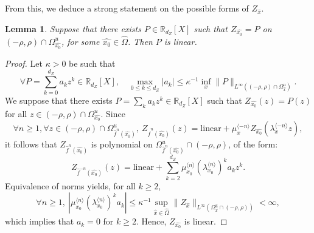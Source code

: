 \documentclass[a4paper]{article}
\newtheorem{lemma}[theorem]{Lemma}
\theoremstyle{definition}
\begin{document}
From this, we deduce a strong statement on the possible forms of $Z_{\widehat{x}}$.

\begin{lemma}\label{lem:polytolin}
Suppose that there exists $P \in \mathbb{R}_{d_Z}[X]$ such that $Z_{{\widehat{x_0}}} = P$ on $(-\rho,\rho) \cap \Omega_{{\widehat{x_0}}}^u$, for some ${\widehat{x_0}} \in \widehat{\Omega}$. Then $P$ is linear. 
\end{lemma}

\begin{proof}
Let $\kappa>0$ be such that $$ \forall P = \sum_{k=0}^{d_Z} a_k z^k \in \mathbb{R}_{d_Z}[X], \quad \max_{0 \leq k \leq d_Z} |a_k| \leq \kappa^{-1} \inf_x \|P\|_{L^\infty( (-\rho,\rho) \cap \Omega_{\widehat{x}}^u )}.$$
We suppose that there exists $P = \sum_k a_k z^k \in \mathbb{R}_{d_Z}[X]$ such that $Z_{{\widehat{x_0}}}(z) = P(z)$ for all $z \in (-\rho,\rho) \cap \Omega_{{\widehat{x_0}}}^u$. Since
$$ \forall n \geq 1, \forall z \in (-\rho,\rho) \cap \Omega_{\widehat{f}^{n}({\widehat{x_0}})}^u , \ Z_{\widehat{f}^n({\widehat{x_0}})}(z) = \text{linear} + \mu_x^{\langle - n \rangle} Z_{{\widehat{x_0}}}(\lambda_x^{\langle - n \rangle} z), $$
it follows that $Z_{\widehat{f}^{n}({\widehat{x_0}})}$ is polynomial on $\Omega_{\widehat{f}^n({\widehat{x_0}})}^u \cap (-\rho,\rho)$, of the form:
$$ Z_{\widehat{f}^{-n}({\widehat{x_0}})}(z) = \text{linear} + \sum_{k=2}^{d_Z} \mu_{x_0}^{\langle n \rangle} (\lambda_{x_0}^{\langle n \rangle})^k a_k z^k. $$
Equivalence of norms yields, for all $k \geq 2$,
$$ \forall n\geq 1, \ | \mu_{x_0}^{\langle n \rangle} (\lambda_{x_0}^{\langle n \rangle})^k a_k  | \leq \kappa^{-1} \sup_{{\widehat{x}} \in \widehat{\Omega}} \|Z_{\widehat{x}}\|_{L^\infty(\Omega_{\widehat{x}}^u \cap (-\rho,\rho))} < \infty ,$$
which implies that $a_k=0$ for $k \geq 2$. Hence, $Z_{{\widehat{x_0}}}$ is linear.
\end{proof}
 
\end{document}

